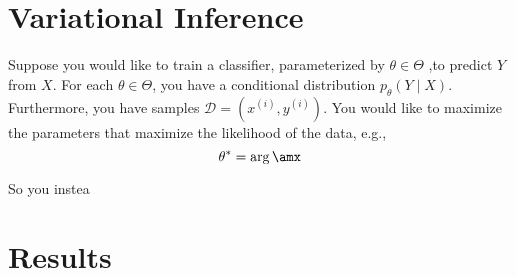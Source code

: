 \documentclass{article}
\begin{document}
    \section{Variational Inference}
    Suppose you would like to train a classifier, parameterized by $\theta \in \Theta$ ,to predict $Y$ from $X$. For each $\theta \in \Theta$, you have a conditional distribution $p_\theta(Y \mid X)$. Furthermore, you have samples $\mathcal D = (x^(i), y^(i))$.
    You would like to maximize the parameters that maximize the likelihood of the data, e.g.,
    \[ \theta^* = \arg\amx \]

    So you instea


    \section{Results}
\end{document}
